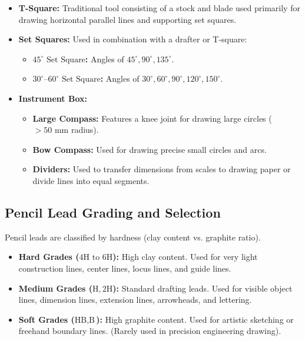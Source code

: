 \begin{itemize}
    \item \textbf{T-Square:} Traditional tool consisting of a stock and blade used primarily for drawing horizontal parallel lines and supporting set squares.
    \item \textbf{Set Squares:} Used in combination with a drafter or T-square:
    \begin{itemize}
        \item \textbf{$45^\circ\text{ Set Square}$:} Angles of $45^\circ, 90^\circ, 135^\circ$.
        \item \textbf{$30^\circ\text{--}60^\circ\text{ Set Square}$:} Angles of $30^\circ, 60^\circ, 90^\circ, 120^\circ, 150^\circ$.
    \end{itemize}
    \item \textbf{Instrument Box:}
    \begin{itemize}
        \item \textbf{Large Compass:} Features a knee joint for drawing large circles ($> 50\text{ mm}$ radius).
        \item \textbf{Bow Compass:} Used for drawing precise small circles and arcs.
        \item \textbf{Dividers:} Used to transfer dimensions from scales to drawing paper or divide lines into equal segments.
    \end{itemize}
\end{itemize}

\subsection{Pencil Lead Grading and Selection}
Pencil leads are classified by hardness (clay content vs. graphite ratio).

\begin{importantrule}
\begin{itemize}
    \item \textbf{Hard Grades ($4\text{H to } 6\text{H}$):} High clay content. Used for very light construction lines, center lines, locus lines, and guide lines.
    \item \textbf{Medium Grades ($\text{H}, 2\text{H}$):} Standard drafting leads. Used for visible object lines, dimension lines, extension lines, arrowheads, and lettering.
    \item \textbf{Soft Grades ($\text{HB}, \text{B}$):} High graphite content. Used for artistic sketching or freehand boundary lines. (Rarely used in precision engineering drawing).
\end{itemize}
\end{importantrule}

